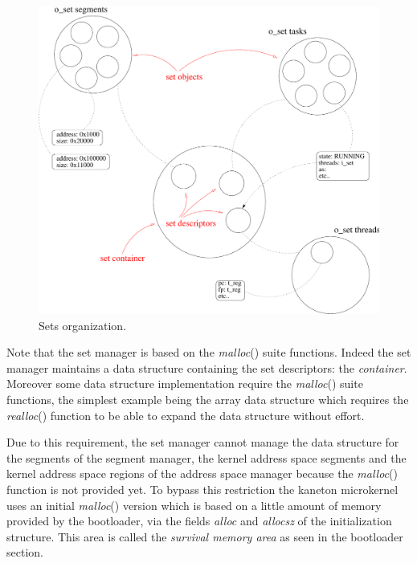 \begin{figure}[h]
  \begin{center}
    \includegraphics[scale=0.5]{figures/core_sets.pdf}
    \caption{Sets organization.}
    \label{figure:core_sets}
  \end{center}
\end{figure}

Note that the set manager is based on the \textit{malloc}() suite functions.
Indeed the set manager maintains a data structure containing the set
descriptors: the \textit{container}. Moreover some data structure
implementation require the \textit{malloc}() suite functions, the simplest
example being the array data structure which requires the \textit{realloc}()
function to be able to expand the data structure without effort.

Due to this requirement, the set manager cannot manage the data structure
for the segments of the segment manager, the kernel address space segments
and the kernel address space regions of the address space manager because
the \textit{malloc}() function is not provided yet. To bypass this restriction
the kaneton microkernel uses an initial \textit{malloc}() version which
is based on a little amount of memory provided by the bootloader, via the
fields \textit{alloc} and \textit{allocsz} of the initialization structure.
This area is called the \textit{survival memory area} as seen in the
bootloader section.

